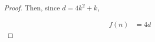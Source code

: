 \documentclass[12pt]{article}
\begin{document}
\begin{enumerate}[a.]
\begin{proof}
        \bigskip

        Then, since $d = 4k^2 + k$,

        \begin{align}
            f(n) &= 4d
        \end{align}
    \end{proof}























\end{enumerate}
\end{document}
